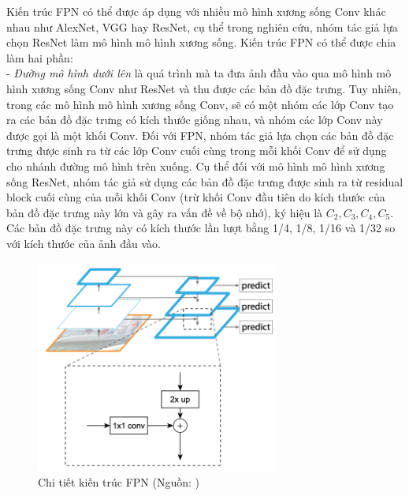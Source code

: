 {    \noindent
    Kiến trúc FPN có thể được áp dụng với nhiều mô hình xương sống Conv khác nhau như AlexNet, VGG hay ResNet, cụ thể trong nghiên cứu, nhóm tác giả lựa chọn ResNet làm mô hình mô hình xương sống.
    Kiến trúc FPN có thể được chia làm hai phần: \\
    - \textit{Đường mô hình dưới lên} là quá trình mà ta đưa ảnh đầu vào qua mô hình mô hình xương sống Conv như ResNet và thu được các bản đồ đặc trưng.
    Tuy nhiên, trong các mô hình mô hình xương sống Conv, sẽ có một nhóm các lớp Conv tạo ra các bản đồ đặc trưng có kích thước giống nhau, và nhóm các lớp Conv này được gọi là một khối Conv.
    Đối với FPN, nhóm tác giả lựa chọn các bản đồ đặc trưng được sinh ra từ các lớp Conv cuối cùng trong mỗi khối Conv để sử dụng cho nhánh đường mô hình trên xuống.
    Cụ thể đối với mô hình mô hình xương sống ResNet, nhóm tác giả sử dụng các bản đồ đặc trưng được sinh ra từ residual block cuối cùng của mỗi khối Conv (trừ khối Conv đầu tiên do kích thước của bản đồ đặc trưng này lớn và gây ra vấn đề về bộ nhớ), ký hiệu là \textit{{${C}_{2}, {C}_{3}, {C}_{4}, {C}_{5}$}}.
    Các bản đồ đặc trưng này có kích thước lần lượt bằng 1/4, 1/8, 1/16 và 1/32 so với kích thước của ảnh đầu vào.

    \begin{figure}[H]
        \centering
        \includegraphics[width=8cm] {images/fpn_detail}
        \caption{Chi tiết kiến trúc FPN (Nguồn: \cite{lin2017feature})}
        \label{fig:fpn_detail}
    \end{figure}

}
